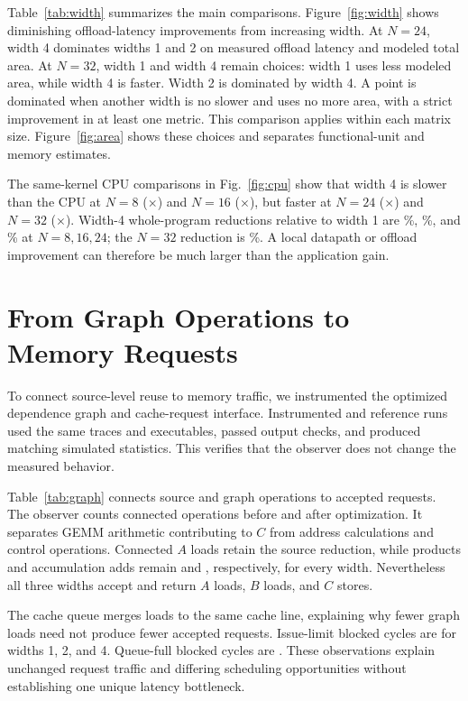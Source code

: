 \documentclass[conference,letterpaper]{IEEEtran}
\begin{document}
Table~\ref{tab:width} summarizes the main comparisons.
Figure~\ref{fig:width} shows diminishing offload-latency improvements from
increasing width. At $N=24$, width 4 dominates widths 1 and 2 on measured
offload latency and modeled total area. At $N=32$, width 1 and width
4 remain choices: width 1 uses less modeled area, while width 4 is faster.
Width 2 is dominated by width 4. A point is dominated when another width
is no slower and uses no more area, with a strict improvement in at least
one metric. This comparison applies within each matrix size.
Figure~\ref{fig:area} shows these choices and separates functional-unit
and memory estimates.

The same-kernel CPU comparisons in Fig.~\ref{fig:cpu} show that
width 4 is slower than the CPU at $N=8$ (\SpeedupEight$\times$) and
$N=16$ (\SpeedupSixteen$\times$), but faster at $N=24$ (\SpeedupTwentyFour$\times$) and
$N=32$ (\SpeedupThirtyTwo$\times$). Width-4 whole-program
reductions relative to width 1 are \ProgramReductionEight\%, \ProgramReductionSixteen\%, and \ProgramReductionTwentyFour\% at
$N=8,16,24$; the $N=32$ reduction is \ProgramReductionThirtyTwo\%. A local datapath or
offload improvement can therefore be much larger than the application gain.

\section{From Graph Operations to Memory Requests}
To connect source-level reuse to memory traffic, we instrumented the
optimized dependence graph and cache-request interface. Instrumented and
reference runs used the same traces and executables, passed output checks,
and produced matching simulated statistics. This verifies that the observer
does not change the measured behavior.


Table~\ref{tab:graph} connects source and graph operations to accepted requests.
The observer counts connected operations before and after optimization.
It separates GEMM arithmetic contributing to $C$ from address calculations
and control operations. Connected $A$
loads retain the source reduction, while products and accumulation adds
remain \GraphProducts{} and \GraphAdds{}, respectively, for every width.
Nevertheless all three widths accept and return \AcceptedALoads{} $A$
loads, \AcceptedBLoads{} $B$ loads, and \AcceptedCStores{} $C$ stores.

The cache queue merges loads to the same cache line, explaining why fewer
graph loads need not produce fewer accepted requests. Issue-limit blocked
cycles are \IssueBlockedCycles{} for widths 1, 2, and 4. Queue-full blocked
cycles are \QueueBlockedCycles{}. These observations explain unchanged request
traffic and differing scheduling opportunities without establishing one
unique latency bottleneck.
\end{document}
